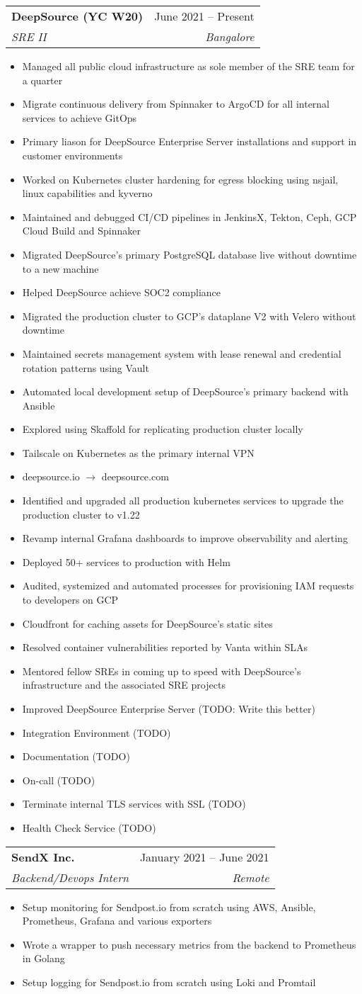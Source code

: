 \documentclass[letterpaper,11pt]{article}
\makeatletter
\newcommand{\resumeItem}[1]{
  \item\small{
    {#1 \vspace{-2pt}}
  }
}
\newcommand{\resumeSubheading}[4]{
  \vspace{-2pt}\item
    \begin{tabular*}{0.97\textwidth}[t]{l@{\extracolsep{\fill}}r}
      \textbf{#1} & #2 \\
      \textit{\small#3} & \textit{\small #4} \\
    \end{tabular*}\vspace{-7pt}
}
\newcommand{\resumeItemListStart}{\begin{itemize}}
\newcommand{\resumeItemListEnd}{\end{itemize}\vspace{-5pt}}
\makeatother
\begin{document}
    \resumeSubheading
      {DeepSource (YC W20)}{June 2021 -- Present}
      {SRE II}{Bangalore}
      \resumeItemListStart
        \resumeItem{Managed all public cloud infrastructure as sole member of the SRE team for a quarter}
        \resumeItem{Migrate continuous delivery from Spinnaker to ArgoCD for all internal services to achieve GitOps}
        \resumeItem{Primary liason for DeepSource Enterprise Server installations and support in customer environments}
        \resumeItem{Worked on Kubernetes cluster hardening for egress blocking using nsjail, linux capabilities and kyverno}
        \resumeItem{Maintained and debugged CI/CD pipelines in JenkinsX, Tekton, Ceph, GCP Cloud Build and Spinnaker}
		\resumeItem{Migrated DeepSource's primary PostgreSQL database live without downtime to a new machine}
		\resumeItem{Helped DeepSource achieve SOC2 compliance}
		\resumeItem{Migrated the production cluster to GCP's dataplane V2 with Velero without downtime}
		\resumeItem{Maintained secrets management system with lease renewal and credential rotation patterns using Vault}
		\resumeItem{Automated local development setup of DeepSource's primary backend with Ansible}
		\resumeItem{Explored using Skaffold for replicating production cluster locally}
		\resumeItem{Tailscale on Kubernetes as the primary internal VPN}
		\resumeItem{deepsource.io $\rightarrow$ deepsource.com}
		\resumeItem{Identified and upgraded all production kubernetes services to upgrade the production cluster to v1.22}
		\resumeItem{Revamp internal Grafana dashboards to improve observability and alerting}
		\resumeItem{Deployed 50+ services to production with Helm}
		\resumeItem{Audited, systemized and automated processes for provisioning IAM requests to developers on GCP}
		\resumeItem{Cloudfront for caching assets for DeepSource's static sites}
		\resumeItem{Resolved container vulnerabilities reported by Vanta within SLAs}
		\resumeItem{Mentored fellow SREs in coming up to speed with DeepSource’s infrastructure and the associated SRE projects}
		\resumeItem{Improved DeepSource Enterprise Server (TODO: Write this better)}
		\resumeItem{Integration Environment (TODO)}
		\resumeItem{Documentation (TODO)}
		\resumeItem{On-call (TODO)}
		\resumeItem{Terminate internal TLS services with SSL (TODO)}
		\resumeItem{Health Check Service (TODO)}
      \resumeItemListEnd

    \resumeSubheading
      {SendX Inc.}{January 2021 -- June 2021}
      {Backend/Devops Intern}{Remote}
      \resumeItemListStart
        \resumeItem{Setup monitoring for Sendpost.io from scratch using AWS, Ansible, Prometheus, Grafana and various exporters}
        \resumeItem{Wrote a wrapper to push necessary metrics from the backend to Prometheus in Golang}
        \resumeItem{Setup logging for Sendpost.io from scratch using Loki and Promtail}
      \resumeItemListEnd
\end{document}
